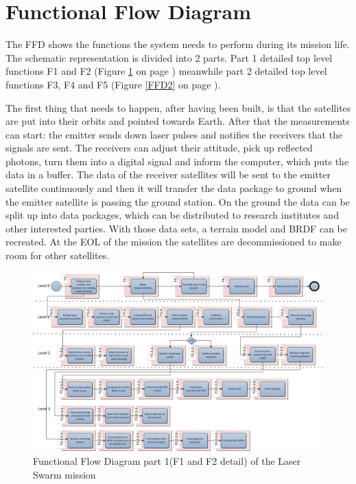 \section{Functional Flow Diagram}
\label{section_FFD}
The \ac{FFD} shows the functions the system needs to perform during its mission life. The schematic representation is divided into 2 parts. Part 1 detailed top level functions F1 and F2 (Figure \ref{FFD1} on page \pageref{FFD1}) meanwhile part 2 detailed top level functions F3, F4 and F5 (Figure \ref{FFD2} on page \pageref{FFD2}).

The first thing that needs to happen, after having been built, is that the satellites are put into their orbits and pointed towards Earth. After that the measurements can start: the emitter sends down laser pulses and notifies the receivers that the signals are sent. The receivers can adjust their attitude, pick up reflected photons, turn them into a digital signal and inform the computer, which puts the data in a buffer. The data of the receiver satellites will be sent to the emitter satellite continuously and then it will transfer the data package to ground when the emitter satellite is passing the ground station. On the ground the data can be split up into data packages, which can be distributed to research institutes and other interested parties. With those data sets, a terrain model and \ac{BRDF} can be recreated. At the \ac{EOL} of the mission the satellites are decommissioned to make room for other satellites.

\begin{landscape}
\begin{figure}[ht!]
\centering
\includegraphics[width=1.3\textheight]{chapters/img/FFD1.jpg}
\caption{Functional Flow Diagram part 1(F1 and F2 detail) of the Laser Swarm mission}
\label{FFD1}
\end{figure}
\end{landscape}

